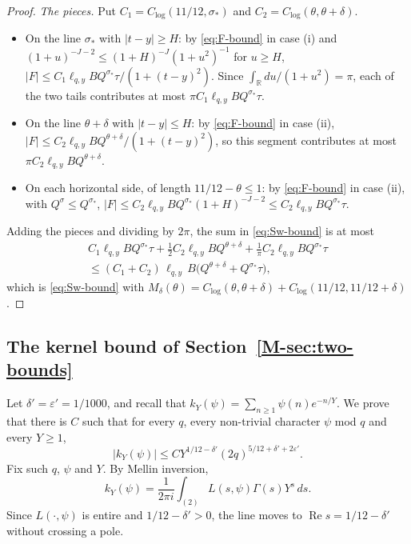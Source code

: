 \documentclass[11pt]{article}
\numberwithin{equation}{section}
\begin{document}
\begin{proof}
\emph{The pieces.} Put $C_1 = C_{\log}(11/12, \sigma_*)$ and $C_2 = C_{\log}(\theta, \theta + \delta)$.
\begin{itemize}
\item On the line $\sigma_*$ with $|t - y| \ge H$: by \eqref{eq:F-bound} in case (i) and
  $(1 + u)^{-J - 2} \le (1 + H)^{-J} (1 + u^2)^{-1}$ for $u \ge H$,
  $|F| \le C_1 \ell_{q, y} B Q^{\sigma_*} \tau/(1 + (t - y)^2)$. Since $\int_{\mathbb R} du/(1 + u^2) = \pi$, each of
  the two tails contributes at most $\pi C_1 \ell_{q, y} B Q^{\sigma_*} \tau$.
\item On the line $\theta + \delta$ with $|t - y| \le H$: by \eqref{eq:F-bound} in case (ii),
  $|F| \le C_2 \ell_{q, y} B Q^{\theta + \delta}/(1 + (t - y)^2)$, so this segment contributes at most
  $\pi C_2 \ell_{q, y} B Q^{\theta + \delta}$.
\item On each horizontal side, of length $11/12 - \theta \le 1$: by \eqref{eq:F-bound} in case (ii), with
  $Q^\sigma \le Q^{\sigma_*}$, $|F| \le C_2 \ell_{q, y} B Q^{\sigma_*} (1 + H)^{-J - 2} \le C_2 \ell_{q, y} B
  Q^{\sigma_*} \tau$.
\end{itemize}
Adding the pieces and dividing by $2\pi$, the sum in \eqref{eq:Sw-bound} is at most
\begin{multline*}
  C_1 \ell_{q, y} B Q^{\sigma_*} \tau + \tfrac12 C_2 \ell_{q, y} B Q^{\theta + \delta} + \tfrac1\pi C_2 \ell_{q, y} B
  Q^{\sigma_*} \tau \\
  \le (C_1 + C_2) \, \ell_{q, y} \, B \bigl(Q^{\theta + \delta} + Q^{\sigma_*} \tau\bigr),
\end{multline*}
which is \eqref{eq:Sw-bound} with $M_\delta(\theta) = C_{\log}(\theta, \theta + \delta) + C_{\log}(11/12, 11/12 +
\delta)$.
\end{proof}

\subsection*{The kernel bound of Section~\ref{M-sec:two-bounds}}

Let $\delta' = \varepsilon' = 1/1000$, and recall that $k_Y(\psi) = \sum_{n \ge 1} \psi(n) e^{-n/Y}$. We prove that
there is $C$ such that for every $q$, every non-trivial character $\psi$ mod $q$ and every $Y \ge 1$,
\[
  |k_Y(\psi)| \le C Y^{1/12 - \delta'} (2q)^{5/12 + \delta' + 2\varepsilon'}.
\]
Fix such $q$, $\psi$ and $Y$. By Mellin inversion,
\[
  k_Y(\psi) = \frac1{2\pi i} \int_{(2)} L(s, \psi) \Gamma(s) Y^s \, ds.
\]
Since $L(\cdot, \psi)$ is entire and $1/12 - \delta' > 0$, the line moves to $\operatorname{Re} s = 1/12 - \delta'$
without crossing a pole.
\end{document}
